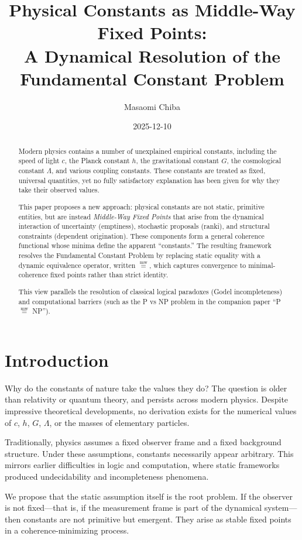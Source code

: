 \documentclass[11pt]{article}
\title{Physical Constants as Middle-Way Fixed Points:\\
A Dynamical Resolution of the Fundamental Constant Problem}
\author{Masaomi Chiba}
\date{2025-12-10}
\newcommand{\mweq}{\mathrel{\overset{\mathrm{mw}}{=}}}
\begin{document}
\maketitle

\begin{abstract}
Modern physics contains a number of unexplained empirical constants,
including the speed of light $c$, the Planck constant $h$, the gravitational
constant $G$, the cosmological constant $\Lambda$, and various coupling
constants. These constants are treated as fixed, universal quantities,
yet no fully satisfactory explanation has been given for why they take
their observed values.

This paper proposes a new approach: physical constants are not static,
primitive entities, but are instead \emph{Middle-Way Fixed Points}
that arise from the dynamical interaction of uncertainty (emptiness),
stochastic proposals (ranki), and structural constraints (dependent
origination). These components form a general coherence functional
whose minima define the apparent ``constants.'' The resulting framework
resolves the Fundamental Constant Problem by replacing static equality
with a dynamic equivalence operator, written $\mweq$, which captures
convergence to minimal-coherence fixed points rather than strict identity.

This view parallels the resolution of classical logical paradoxes
(Godel incompleteness) and computational barriers (such as
the P vs NP problem in the companion paper ``P $\mweq$ NP'').
\end{abstract}

\section{Introduction}

Why do the constants of nature take the values they do?
The question is older than relativity or quantum theory, and
persists across modern physics. Despite impressive theoretical
developments, no derivation exists for the numerical values of
$c$, $h$, $G$, $\Lambda$, or the masses of elementary particles.

Traditionally, physics assumes a fixed observer frame and a fixed
background structure. Under these assumptions, constants necessarily
appear arbitrary. This mirrors earlier difficulties in logic and
computation, where static frameworks produced undecidability and
incompleteness phenomena.

We propose that the static assumption itself is the root problem.
If the observer is not fixed---that is, if the measurement frame
is part of the dynamical system---then constants are not primitive
but emergent. They arise as stable fixed points in a coherence-minimizing
process.
\end{document}
